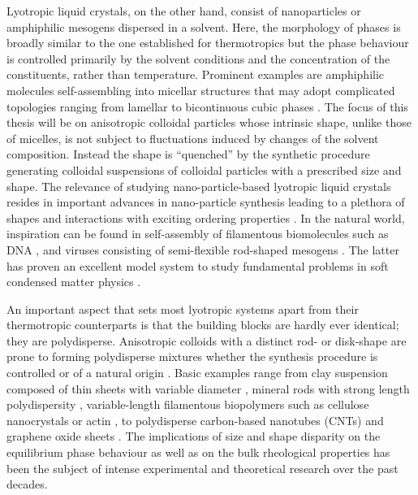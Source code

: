 \documentclass[amssymb]{revtex4}
\begin{document}
Lyotropic liquid crystals, on the other hand,  consist of nanoparticles or amphiphilic mesogens dispersed in a solvent. Here, the morphology of phases is broadly similar to the one established for thermotropics but the phase behaviour is controlled primarily by the solvent conditions and the concentration of the constituents, rather than temperature. 
Prominent examples are amphiphilic molecules  self-assembling into micellar structures that may adopt complicated topologies ranging from lamellar to bicontinuous cubic phases \cite{seddon1993}. The focus of this thesis  will be on anisotropic colloidal particles whose intrinsic shape, unlike those of micelles, is not subject to fluctuations induced by changes of the solvent composition. Instead the shape is ``quenched''  by the synthetic procedure generating  colloidal suspensions of colloidal particles with a prescribed size and shape.   The relevance of studying nano-particle-based lyotropic liquid crystals  resides in important advances in nano-particle synthesis leading to a plethora of  shapes and interactions with exciting ordering properties \cite{gabriel_davidson2000}. In the natural world, inspiration can be found in self-assembly of filamentous biomolecules  such as DNA \cite{livolantdnaoverview}, and viruses consisting of semi-flexible rod-shaped mesogens \cite{dogic-fraden_fil}. The latter has proven an excellent model system to study fundamental problems in soft condensed matter physics  \cite{dogic2016}. 

An important aspect that sets most lyotropic systems apart from their thermotropic counterparts is that the building blocks are hardly ever identical; they are polydisperse. 
Anisotropic colloids with a distinct  rod- or disk-shape are prone to forming polydisperse mixtures whether the synthesis procedure is controlled or of a natural origin \cite{davidson-overview,davidson1997}. Basic examples range from clay suspension composed of thin sheets with variable diameter \cite{paineau2013},  mineral rods with strong length polydispersity  \cite{buining_jacs1991,vdpol_jcp2008,woolston_jcp2015}, variable-length filamentous biopolymers such as cellulose nanocrystals \cite{lagerwall2014a} or actin \cite{furukawa_actin1993}, to polydisperse carbon-based nanotubes (CNTs) \cite{baughman_cnt2002} and graphene oxide sheets \cite{xu_graphene_LC_2011}.  The implications of size and shape disparity on the equilibrium phase behaviour as well as on the bulk rheological  properties has been the subject of intense experimental and theoretical research over the past decades. 
\end{document}
